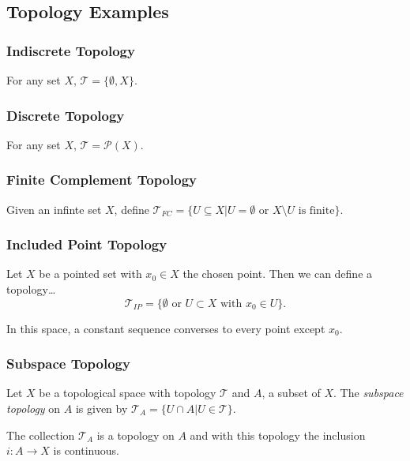 \subsection{Topology Examples}\label{exampletopologies}

\subsubsection{Indiscrete Topology}\label{indiscretetopology}

For any set $X$, $\mathcal{T} = \{\emptyset, X\}$.

\subsubsection{Discrete Topology}\label{discretetopology}

For any set $X$, $\mathcal{T} = \mathcal{P}(X)$.

\subsubsection{Finite Complement Topology}\label{finitecomplementtopology}

Given an infinte set $X$, define $\mathcal{T}_{FC} = \{U \subseteq X | U = \emptyset \textrm{ or } X \setminus U \textrm{ is finite}\}$.

\subsubsection{Included Point Topology}\label{includedpointtopology}
Let $X$ be a pointed set with $x_0 \in X$ the chosen point. Then we can define a topology\dots
$$\mathcal{T}_{IP} = \{ \emptyset \textrm{ or } U \subset X \textrm{ with } x_0 \in U \}.$$

\noindent In this space, a constant sequence converses to every point except $x_0$.

\subsubsection{Subspace Topology}\label{subspacetopology}
Let $X$ be a topological space with topology $\mathcal{T}$ and $A$, a subset of $X$. The \emph{subspace topology} on $A$ is given by $\mathcal{T}_A = \{ U \cap A | U \in \mathcal{T} \}$.

\begin{proposition}
The collection $\mathcal{T}_A$ is a topology on $A$ and with this topology the inclusion $i : A \rightarrow X$ is continuous.
\end{proposition}